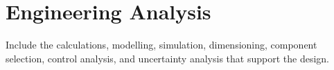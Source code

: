 \section{Engineering Analysis}
Include the calculations, modelling, simulation, dimensioning, 
component selection, control analysis, and uncertainty analysis that 
support the design. 